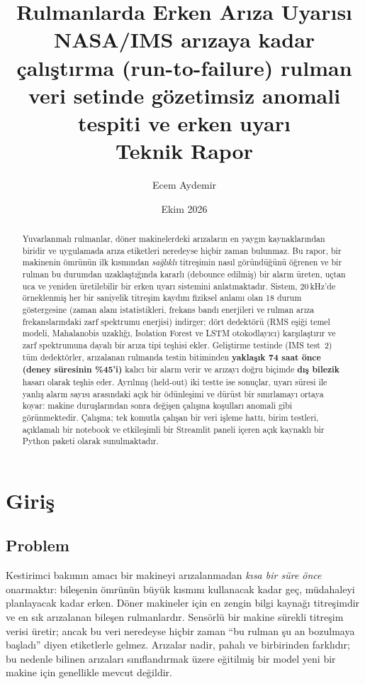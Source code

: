 \documentclass[11pt]{article}
\title{\textbf{Rulmanlarda Erken Arıza Uyarısı}\\[0.3em]
\large NASA/IMS arızaya kadar çalıştırma (run-to-failure) rulman veri setinde gözetimsiz anomali tespiti ve erken uyarı\\[0.2em]
\normalsize Teknik Rapor}
\author{Ecem Aydemir}
\date{Ekim 2026}
\begin{document}
\maketitle
\thispagestyle{empty}

\begin{abstract}
\noindent
Yuvarlanmalı rulmanlar, döner makinelerdeki arızaların en yaygın kaynaklarından biridir ve
uygulamada arıza etiketleri neredeyse hiçbir zaman bulunmaz. Bu rapor, bir makinenin ömrünün ilk
kısmından \emph{sağlıklı} titreşimin nasıl göründüğünü öğrenen ve bir rulman bu durumdan uzaklaştığında
kararlı (debounce edilmiş) bir alarm üreten, uçtan uca ve yeniden üretilebilir bir erken uyarı sistemini
anlatmaktadır. Sistem, 20\,kHz'de örneklenmiş her bir saniyelik titreşim kaydını fiziksel anlamı olan
18 durum göstergesine (zaman alanı istatistikleri, frekans bandı enerjileri ve rulman arıza
frekanslarındaki zarf spektrumu enerjisi) indirger; dört dedektörü (RMS eşiği temel modeli, Mahalanobis
uzaklığı, Isolation Forest ve LSTM otokodlayıcı) karşılaştırır ve zarf spektrumuna dayalı bir arıza
tipi teşhisi ekler. Geliştirme testinde (IMS test~2) tüm dedektörler, arızalanan rulmanda testin
bitiminden \textbf{yaklaşık 74 saat önce (deney süresinin \%45'i)} kalıcı bir alarm verir ve arızayı
doğru biçimde \textbf{dış bilezik} hasarı olarak teşhis eder. Ayrılmış (held-out) iki testte ise
sonuçlar, uyarı süresi ile yanlış alarm sayısı arasındaki açık bir ödünleşimi ve dürüst bir sınırlamayı
ortaya koyar: makine duruşlarından sonra değişen çalışma koşulları anomali gibi görünmektedir. Çalışma;
tek komutla çalışan bir veri işleme hattı, birim testleri, açıklamalı bir notebook ve etkileşimli bir
Streamlit paneli içeren açık kaynaklı bir Python paketi olarak sunulmaktadır.
\end{abstract}

\tableofcontents
\newpage

\section{Giriş}

\subsection{Problem}
Kestirimci bakımın amacı bir makineyi arızalanmadan \emph{kısa bir süre önce} onarmaktır: bileşenin
ömrünün büyük kısmını kullanacak kadar geç, müdahaleyi planlayacak kadar erken. Döner makineler için
en zengin bilgi kaynağı titreşimdir ve en sık arızalanan bileşen rulmanlardır. Sensörlü bir makine
sürekli titreşim verisi üretir; ancak bu veri neredeyse hiçbir zaman ``bu rulman şu an bozulmaya
başladı'' diyen etiketlerle gelmez. Arızalar nadir, pahalı ve birbirinden farklıdır; bu nedenle bilinen
arızaları sınıflandırmak üzere eğitilmiş bir model yeni bir makine için genellikle mevcut değildir.
\end{document}
